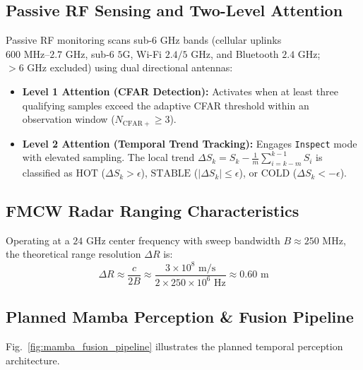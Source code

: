 \subsection{Passive RF Sensing and Two-Level Attention}
Passive RF monitoring scans sub-$6\text{ GHz}$ bands (cellular uplinks $600\text{ MHz}\text{--}2.7\text{ GHz}$, sub-$6\text{ 5G}$, Wi-Fi $2.4/5\text{ GHz}$, and Bluetooth $2.4\text{ GHz}$; $>6\text{ GHz}$ excluded) using dual directional antennas:
\begin{itemize}
    \item \textbf{Level 1 Attention (CFAR Detection):} Activates when at least three qualifying samples exceed the adaptive CFAR threshold within an observation window ($N_{\mathrm{CFAR+}} \ge 3$).
    \item \textbf{Level 2 Attention (Temporal Trend Tracking):} Engages \texttt{Inspect} mode with elevated sampling. The local trend $\Delta S_k = S_k - \frac{1}{m} \sum_{i=k-m}^{k-1} S_i$ is classified as $\text{HOT}$ ($\Delta S_k > \epsilon$), $\text{STABLE}$ ($|\Delta S_k| \le \epsilon$), or $\text{COLD}$ ($\Delta S_k < -\epsilon$).
\end{itemize}

\subsection{FMCW Radar Ranging Characteristics}
Operating at a $24\text{ GHz}$ center frequency with sweep bandwidth $B \approx 250\text{ MHz}$, the theoretical range resolution $\Delta R$ is:
\begin{equation}
\Delta R \approx \frac{c}{2B} \approx \frac{3 \times 10^8\text{ m/s}}{2 \times 250 \times 10^6\text{ Hz}} \approx 0.60\text{ m}
\end{equation}

\subsection{Planned Mamba Perception \& Fusion Pipeline}
Fig.~\ref{fig:mamba_fusion_pipeline} illustrates the planned temporal perception architecture.


